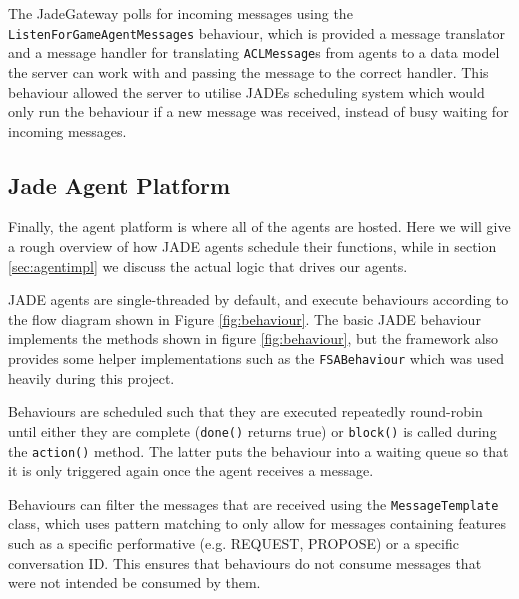 \documentclass[conference]{IEEEtran}
\begin{document}
The JadeGateway polls for incoming messages using the \lstinline{ListenForGameAgentMessages} behaviour, which is provided a message translator and a message handler for translating \lstinline{ACLMessage}s from agents to a data model the server can work with and passing the message to the correct handler. This behaviour allowed the server to utilise JADEs scheduling system which would only run the behaviour if a new message was received, instead of busy waiting for incoming messages.

\subsection{Jade Agent Platform}

Finally, the agent platform is where all of the agents are hosted. Here we will give a rough overview of how JADE agents schedule their functions, while in section \ref{sec:agentimpl} we discuss the actual logic that drives our agents.

JADE agents are single-threaded by default, and execute behaviours according to the flow diagram shown in Figure \ref{fig:behaviour}. The basic JADE behaviour implements the methods shown in figure \ref{fig:behaviour}, but the framework also provides some helper implementations such as the \lstinline{FSABehaviour} which was used heavily during this project. 

Behaviours are scheduled such that they are executed repeatedly round-robin until either they are complete (\lstinline{done()} returns true) or \lstinline{block()} is called during the \lstinline{action()} method. The latter puts the behaviour into a waiting queue so that it is only triggered again once the agent receives a message. 

Behaviours can filter the messages that are received using the \lstinline{MessageTemplate} class, which uses pattern matching to only allow for messages containing features such as a specific performative (e.g. REQUEST, PROPOSE) or a specific conversation ID. This ensures that behaviours do not consume messages that were not intended be consumed by them. 
\end{document}
